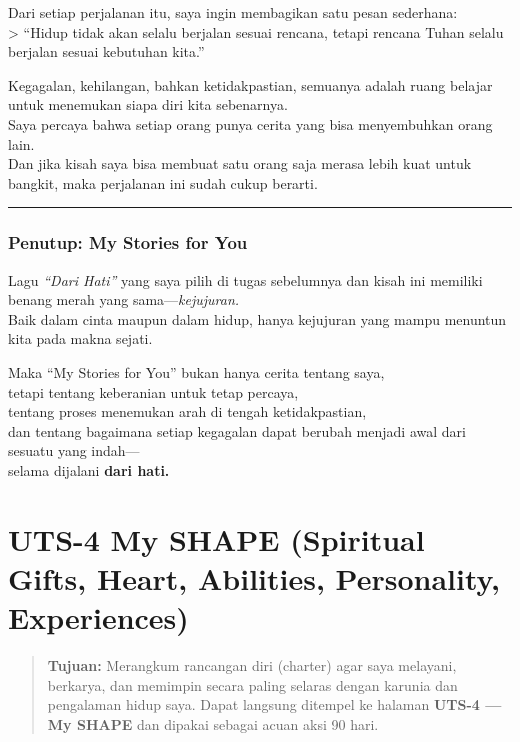 \documentclass[
  letterpaper,
  DIV=11,
  numbers=noendperiod]{scrreprt}
\begin{document}
Dari setiap perjalanan itu, saya ingin membagikan satu pesan
sederhana:\\
\textgreater{} ``Hidup tidak akan selalu berjalan sesuai rencana, tetapi
rencana Tuhan selalu berjalan sesuai kebutuhan kita.''

Kegagalan, kehilangan, bahkan ketidakpastian, semuanya adalah ruang
belajar untuk menemukan siapa diri kita sebenarnya.\\
Saya percaya bahwa setiap orang punya cerita yang bisa menyembuhkan
orang lain.\\
Dan jika kisah saya bisa membuat satu orang saja merasa lebih kuat untuk
bangkit, maka perjalanan ini sudah cukup berarti.

\begin{center}\rule{0.5\linewidth}{0.5pt}\end{center}

\subsection{\texorpdfstring{\textbf{Penutup: My Stories for
You}}{Penutup: My Stories for You}}\label{penutup-my-stories-for-you}

Lagu \emph{``Dari Hati''} yang saya pilih di tugas sebelumnya dan kisah
ini memiliki benang merah yang sama---\emph{kejujuran.}\\
Baik dalam cinta maupun dalam hidup, hanya kejujuran yang mampu menuntun
kita pada makna sejati.

Maka ``My Stories for You'' bukan hanya cerita tentang saya,\\
tetapi tentang keberanian untuk tetap percaya,\\
tentang proses menemukan arah di tengah ketidakpastian,\\
dan tentang bagaimana setiap kegagalan dapat berubah menjadi awal dari
sesuatu yang indah---\\
selama dijalani \textbf{dari hati.}


\chapter{UTS-4 My SHAPE (Spiritual Gifts, Heart, Abilities, Personality,
Experiences)}\label{uts-4-my-shape-spiritual-gifts-heart-abilities-personality-experiences}

\begin{quote}
\textbf{Tujuan:} Merangkum rancangan diri (charter) agar saya melayani,
berkarya, dan memimpin secara paling selaras dengan karunia dan
pengalaman hidup saya. Dapat langsung ditempel ke halaman \textbf{UTS-4
--- My SHAPE} dan dipakai sebagai acuan aksi 90 hari.
\end{quote}
\end{document}
